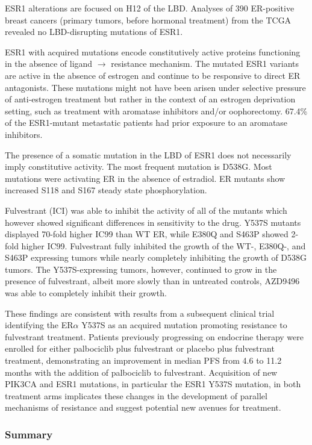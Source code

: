 ESR1 alterations are focused on H12 of the LBD. Analyses of 390 ER-positive breast cancers (primary tumors, before hormonal treatment) from the TCGA revealed no LBD-disrupting mutations of ESR1.

ESR1 with acquired mutations encode constitutively active proteins functioning in the absence of ligand $\rightarrow$ resistance mechanism. The mutated ESR1 variants are active in the absence of estrogen and continue to be responsive to direct ER antagonists. These mutations might not have been arisen under selective pressure of anti-estrogen treatment but rather in the context of an estrogen deprivation setting, such as treatment with aromatase inhibitors and/or oophorectomy. 67.4\% of the ESR1-mutant metastatic patients had prior exposure to an aromatase inhibitors.

The presence of a somatic mutation in the LBD of ESR1 does not necessarily imply constitutive activity. The most frequent mutation is D538G. Most mutations were activating ER in the absence of estradiol. ER mutants show increased S118 and S167 steady state phosphorylation.

Fulvestrant (ICI) was able to inhibit the activity of all of the mutants which however showed significant differences in sensitivity to the drug. Y537S mutants displayed 70-fold higher IC99 than WT ER, while E380Q and S463P showed 2-fold higher IC99. Fulvestrant fully inhibited the growth of the WT-, E380Q-, and S463P expressing tumors while nearly completely inhibiting the growth of D538G tumors. The Y537S-expressing tumors, however, continued to grow in the presence of fulvestrant, albeit more slowly than in untreated controls, AZD9496 was able to completely inhibit their growth.

These findings are consistent with results from a subsequent clinical trial identifying the ER$\alpha$ Y537S as an acquired mutation promoting resistance to fulvestrant treatment.
Patients previously progressing on endocrine therapy were enrolled for either palbociclib plus fulvestrant or placebo plus fulvestrant treatment, demonstrating an improvement in median PFS from 4.6 to 11.2 months with the addition of palbociclib to fulvestrant. Acquisition of new PIK3CA and ESR1 mutations, in particular the ESR1 Y537S mutation, in both treatment arms implicates these changes in the development of parallel mechanisms of resistance and suggest potential new avenues for treatment.

\hypertarget{summary}{%
\subsubsection{Summary}\label{summary}}

